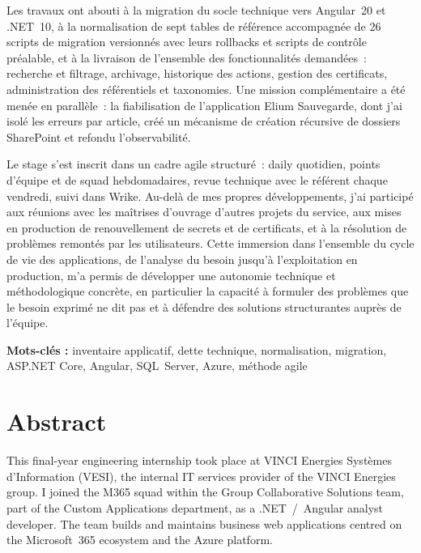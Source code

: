 Les travaux ont abouti à la migration du socle technique vers Angular~20 et
.NET~10, à la normalisation de sept tables de référence accompagnée de 26
scripts de migration versionnés avec leurs rollbacks et scripts de contrôle
préalable, et à la livraison de l'ensemble des fonctionnalités demandées~:
recherche et filtrage, archivage, historique des actions, gestion des
certificats, administration des référentiels et taxonomies. Une mission
complémentaire a été menée en parallèle~: la fiabilisation de l'application
Elium Sauvegarde, dont j'ai isolé les erreurs par article, créé un mécanisme de
création récursive de dossiers SharePoint et refondu l'observabilité.

Le stage s'est inscrit dans un cadre agile structuré~: daily quotidien, points
d'équipe et de squad hebdomadaires, revue technique avec le référent chaque
vendredi, suivi dans Wrike. Au-delà de mes propres développements, j'ai
participé aux réunions avec les maîtrises d'ouvrage d'autres projets du
service, aux mises en production de renouvellement de secrets et de certificats,
et à la résolution de problèmes remontés par les utilisateurs. Cette immersion dans l'ensemble du cycle de vie des applications, de l'analyse du besoin
jusqu'à l'exploitation en production, m'a permis de développer une autonomie
technique et méthodologique concrète, en particulier la capacité à formuler des
problèmes que le besoin exprimé ne dit pas et à défendre des solutions
structurantes auprès de l'équipe.

\vspace{0.5em}
\noindent\textbf{Mots-clés :} inventaire applicatif, dette technique,
normalisation, migration, ASP.NET Core, Angular, SQL~Server, Azure, méthode
agile

\newpage

\chapter*{Abstract}

This final-year engineering internship took place at VINCI Energies Systèmes
d'Information (VESI), the internal IT services provider of the VINCI Energies
group. I joined the M365 squad within the Group Collaborative Solutions team,
part of the Custom Applications department, as a .NET~/~Angular analyst
developer. The team builds and maintains business web applications centred on
the Microsoft~365 ecosystem and the Azure platform.

